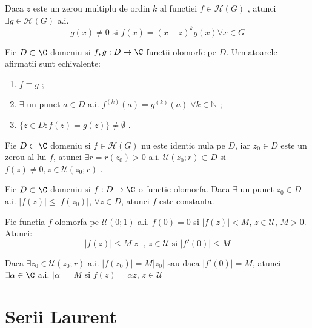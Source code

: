 \begin{theorem}
    Daca $z$ este un zerou multiplu de ordin $k$ al functiei $f \in \mathcal{H}(G)$ , atunci
    $\exists g \in \mathcal{H}(G)$ a.i.
    \[
        g(x) \neq 0 \text{ si }  f(x) = (x-z)^k g(x) \forall x \in G
    \]
\end{theorem}

\begin{theorem}
    Fie $D \subset \C$ domeniu si $f,g : D\mapsto \C$ functii olomorfe pe $D$. Urmatoarele afirmatii
    sunt echivalente:
    \begin{enumerate}
        \item $f \equiv g$ ;
        \item $\exists$ un punct $a\in D$ a.i. $f^{(k)}(a) = g^{(k)}(a)\; \forall k \in \mathbb{N}$ ;
        \item $ \{z \in D \colon f(z) = g(z)\} \neq \emptyset$ .
    \end{enumerate}
\end{theorem}

\begin{theorem}
    Fie $D \subset \C$ domeniu si $f\in \mathcal{H}(G)$ nu este identic nula pe $D$, iar $z_0 \in D$
    este un zerou al lui $f$, atunci $\exists r=r(z_0)>0$  a.i. $\mathcal{U}(z_0;r) \subset D $
    si $f(z) \neq 0, z\in \dot{\mathcal{U}}(z_0;r)$ .
\end{theorem}

\begin{theorem}
    Fie $D \subset \C$ domeniu si $f:D\mapsto \C$ o functie olomorfa. Daca $\exists$ un punct
    $z_0 \in D$ a.i. $|f(z)| \leq |f(z_0)|$, $\forall z \in D $, atunci $f$ este constanta.
\end{theorem}

\begin{theorem}
    Fie functia $f$ olomorfa pe $\mathcal{U}(0;1)$ a.i. $f(0) = 0$ si $|f(z)| < M$,
    $z\in \mathcal{U}$, $M>0$. Atunci:
    \[
        |f(z)| \leq M |z| \text{ , } z \in \mathcal{U} \text{ si } |f'(0)| \leq M
    \]

    Daca $\exists z_0 \in \dot{\mathcal{U}}(z_0;r)$ a.i. $|f(z_0)| = M |z_0| $ sau daca
    $|f'(0)| = M$, atunci $\exists \alpha \in \C $ a.i. $|\alpha| = M $ si $f(z) = \alpha z$,
    $z \in \mathcal{U}$
\end{theorem}

\section{Serii Laurent}

